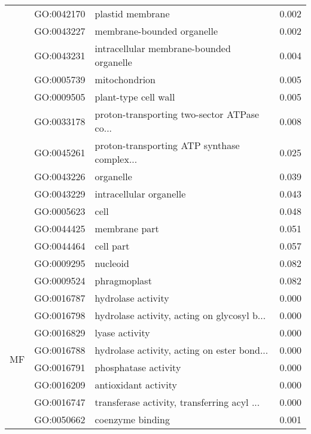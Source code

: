 \begin{longtable}{lllr}
   & GO:0042170 &                             plastid membrane &         0.002 \\
   & GO:0043227 &                   membrane-bounded organelle &         0.002 \\
   & GO:0043231 &     intracellular membrane-bounded organelle &         0.004 \\
   & GO:0005739 &                                mitochondrion &         0.005 \\
   & GO:0009505 &                         plant-type cell wall &         0.005 \\
   & GO:0033178 &  proton-transporting two-sector ATPase co... &         0.008 \\
   & GO:0045261 &  proton-transporting ATP synthase complex... &         0.025 \\
   & GO:0043226 &                                    organelle &         0.039 \\
   & GO:0043229 &                      intracellular organelle &         0.043 \\
   & GO:0005623 &                                         cell &         0.048 \\
   & GO:0044425 &                                membrane part &         0.051 \\
   & GO:0044464 &                                    cell part &         0.057 \\
   & GO:0009295 &                                     nucleoid &         0.082 \\
   & GO:0009524 &                                 phragmoplast &         0.082 \\
\cline{1-4}
\multirow{45}{*}{MF} & GO:0016787 &                           hydrolase activity &         0.000 \\
   & GO:0016798 &  hydrolase activity, acting on glycosyl b... &         0.000 \\
   & GO:0016829 &                               lyase activity &         0.000 \\
   & GO:0016788 &  hydrolase activity, acting on ester bond... &         0.000 \\
   & GO:0016791 &                         phosphatase activity &         0.000 \\
   & GO:0016209 &                         antioxidant activity &         0.000 \\
   & GO:0016747 &  transferase activity, transferring acyl ... &         0.000 \\
   & GO:0050662 &                             coenzyme binding &         0.001 \\

\end{longtable}
